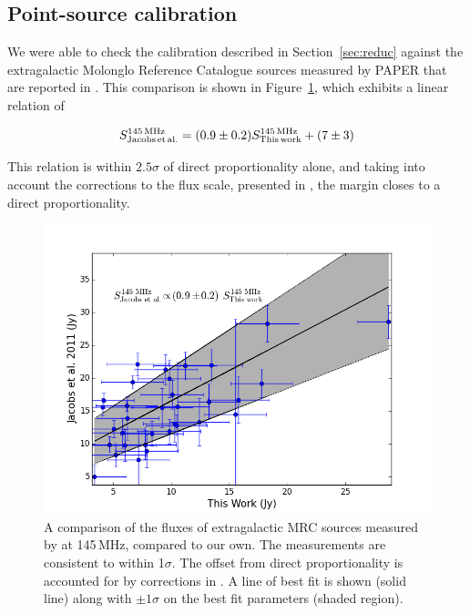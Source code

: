 \documentclass[useAMS,usenatbib]{mn2e}
\begin{document}
\subsection{Point-source calibration}
\label{subsec:pscal}
We were able to check the calibration described in Section~\ref{sec:reduc} against the extragalactic Molonglo Reference Catalogue \citep[MRC;][]{Large.81} sources measured by PAPER that are reported in \cite{Jacobs.11}. This comparison is shown in Figure~\ref{fig:PScal}, which exhibits a linear relation of

\begin{equation}
S^{145\,\rm{MHz}}_{\rm{Jacobs\,et\,al.}} = (0.9\pm0.2) S^{145\,\rm{MHz}}_{\rm{This\,work}} + (7\pm3)
\label{eq:PScal}
\end{equation}

This relation is within $2.5\sigma$ of direct proportionality alone, and taking into account the corrections to the \cite{Jacobs.11} flux scale, presented in \cite{Jacobs.13}, the margin closes to a direct proportionality.

\begin{figure}
\includegraphics[width=\columnwidth]{us_and_danny_cal.png}
\caption{A comparison of the fluxes of extragalactic MRC sources measured by \protect\cite{Jacobs.11} at 145\,MHz, compared to our own. The measurements are consistent to within 1$\sigma$. The offset from direct proportionality is accounted for by corrections in \protect\cite[][see Section 3 of their paper]{Jacobs.13}.  A line of best fit is shown (solid line) along with $\pm1\sigma$ on the best fit parameters (shaded region).}
\label{fig:PScal}
\end{figure}
\end{document}
